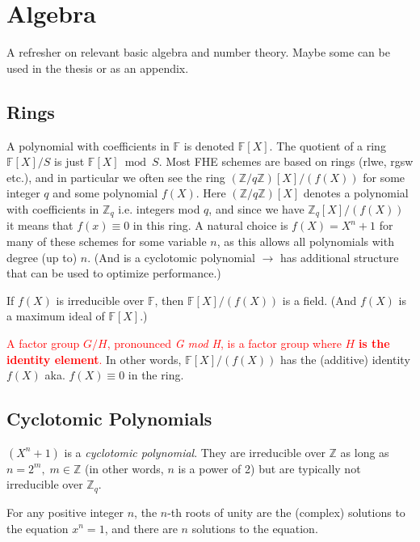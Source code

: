\chapter{Algebra}
A refresher on relevant basic algebra and number theory. Maybe some can be used in the thesis or as an appendix.

\section{Rings}
A polynomial with coefficients in $\mathbb{F}$ is denoted $\mathbb{F}[X]$. The quotient of a ring $\mathbb{F}[X]/{S}$ is just $\mathbb{F}[X] \bmod{S}$. Most FHE schemes are based on rings (\gls{rlwe}, \gls{rgsw} etc.), and in particular we often see the ring $(\mathbb{Z}/q\mathbb{Z})[X] / (f(X))$ for some integer $q$ and some polynomial $f(X)$. Here $(\mathbb{Z}/q\mathbb{Z})[X]$ denotes a polynomial with coefficients in $\mathbb{Z}_q$ i.e. integers mod $q$, and since we have $\mathbb{Z}_q[X]/(f(X))$ it means that $f(x) \equiv 0$ in this ring. A natural choice is $f(X) = X^n + 1$ for many of these schemes for some variable $n$, as this allows all polynomials with degree (up to) $n$. (And is a cyclotomic polynomial $\to$ has additional structure that can be used to optimize performance.)

If $f(X)$ is irreducible over $\mathbb{F}$, then $\mathbb{F}[X]/(f(X))$ is a field. (And $f(X)$ is a maximum ideal of $\mathbb{F}[X]$.)

\textcolor{red}{A factor group $G/H$, pronounced \emph{G mod H}, is a factor group where $H$ \textbf{is the identity element}.} In other words, $\mathbb{F}[X]/(f(X))$ has the (additive) identity $f(X)$ aka. $f(X) \equiv 0$ in the ring.

\section{Cyclotomic Polynomials}
$(X^n + 1)$ is a \emph{cyclotomic polynomial}.
They are irreducible over $\mathbb{Z}$ as long as $n = 2^m,\; m\in\mathbb{Z}$ (in other words, $n$ is a power of 2) but are typically not irreducible over $\mathbb{Z}_q$.

\begin{definition}
    \label{def:roots-of-unity}
    For any positive integer $n$, the $n$-th roots of unity are the (complex) solutions to the equation $x^n = 1$, and there are $n$ solutions to the equation.
\end{definition}

